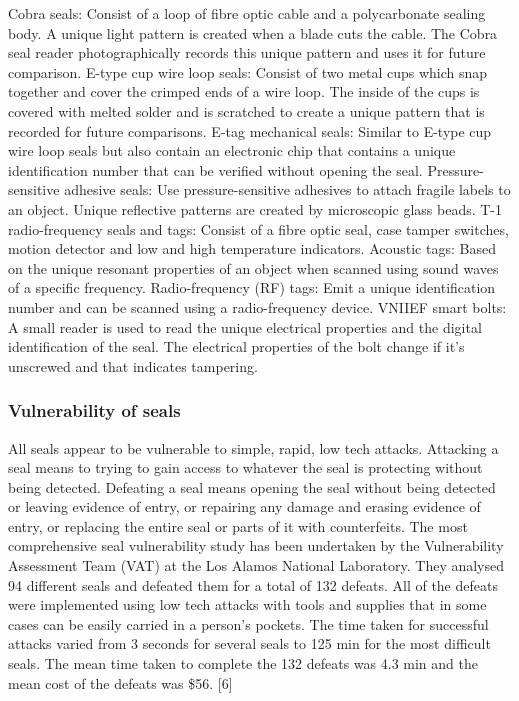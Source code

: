 \documentclass[a4paper]{article}
\begin{document}
Cobra seals: Consist of a loop of fibre optic cable and a polycarbonate sealing body. A unique
light pattern is created when a blade cuts the cable. The Cobra seal reader photographically
records this unique pattern and uses it for future comparison.
E-type cup wire loop seals: Consist of two metal cups which snap together and cover the
crimped ends of a wire loop. The inside of the cups is covered with melted solder and is
scratched to create a unique pattern that is recorded for future comparisons.
E-tag mechanical seals: Similar to E-type cup wire loop seals but also contain an electronic chip
that contains a unique identification number that can be verified without opening the seal.
Pressure-sensitive adhesive seals: Use pressure-sensitive adhesives to attach fragile labels to an
object. Unique reflective patterns are created by microscopic glass beads.
T-1 radio-frequency seals and tags: Consist of a fibre optic seal, case tamper switches, motion
detector and low and high temperature indicators.
Acoustic tags: Based on the unique resonant properties of an object when scanned using sound
waves of a specific frequency.
Radio-frequency (RF) tags: Emit a unique identification number and can be scanned using a
radio-frequency device.
VNIIEF smart bolts: A small reader is used to read the unique electrical properties and the digital
identification of the seal. The electrical properties of the bolt change if it’s unscrewed and that
indicates tampering.

\subsubsection{Vulnerability of seals}
All seals appear to be vulnerable to simple, rapid, low tech attacks. Attacking a seal means to trying
to gain access to whatever the seal is protecting without being detected. Defeating a seal means
opening the seal without being detected or leaving evidence of entry, or repairing any damage and
erasing evidence of entry, or replacing the entire seal or parts of it with counterfeits. The most
comprehensive seal vulnerability study has been undertaken by the Vulnerability Assessment Team
(VAT) at the Los Alamos National Laboratory. They analysed 94 different seals and defeated them for
a total of 132 defeats. All of the defeats were implemented using low tech attacks with tools and
supplies that in some cases can be easily carried in a person’s pockets. The time taken for successful
attacks varied from 3 seconds for several seals to 125 min for the most difficult seals. The mean time
taken to complete the 132 defeats was 4.3 min and the mean cost of the defeats was \$56. [6]
\end{document}
